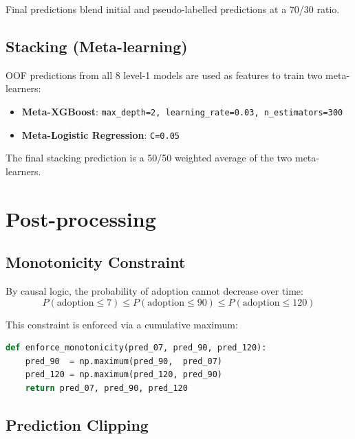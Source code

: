\documentclass[12pt,a4paper]{article}
\begin{document}
Final predictions blend initial and pseudo-labelled predictions at a 70/30 ratio.

\subsection{Stacking (Meta-learning)}

OOF predictions from all 8 level-1 models are used as features to train two meta-learners:
\begin{itemize}[noitemsep]
    \item \textbf{Meta-XGBoost}: \texttt{max\_depth=2, learning\_rate=0.03, n\_estimators=300}
    \item \textbf{Meta-Logistic Regression}: \texttt{C=0.05}
\end{itemize}

The final stacking prediction is a 50/50 weighted average of the two meta-learners.

\section{Post-processing}

\subsection{Monotonicity Constraint}

By causal logic, the probability of adoption cannot decrease over time:
\begin{equation}
    P(\text{adoption} \leq 7) \leq P(\text{adoption} \leq 90) \leq P(\text{adoption} \leq 120)
\end{equation}

This constraint is enforced via a cumulative maximum:

\begin{lstlisting}[language=Python, caption=Enforcing monotonicity]
def enforce_monotonicity(pred_07, pred_90, pred_120):
    pred_90  = np.maximum(pred_90,  pred_07)
    pred_120 = np.maximum(pred_120, pred_90)
    return pred_07, pred_90, pred_120
\end{lstlisting}

\subsection{Prediction Clipping}
\end{document}
